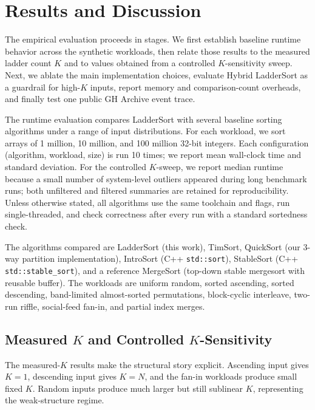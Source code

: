 \documentclass[10pt]{article}
\begin{document}
\section{\texorpdfstring{\textbf{Results and Discussion}}{Results and Discussion}}\label{results-and-discussion}

The empirical evaluation proceeds in stages. We first establish baseline
runtime behavior across the synthetic workloads, then relate those results to
the measured ladder count \(K\) and to values obtained from a controlled
\(K\)-sensitivity sweep. Next, we ablate the main implementation choices,
evaluate Hybrid LadderSort as a guardrail for high-\(K\) inputs, report memory
and comparison-count overheads, and finally test one public GH Archive event
trace.

The runtime evaluation compares LadderSort with several baseline sorting
algorithms under a range of input distributions. For each workload, we sort
arrays of 1 million, 10 million, and 100 million 32-bit integers. Each
configuration (algorithm, workload, size) is run 10 times; we report mean
wall-clock time and standard deviation. For the controlled \(K\)-sweep, we
report median runtime because a small number of system-level outliers appeared
during long benchmark runs; both unfiltered and filtered summaries are retained
for reproducibility. Unless otherwise stated, all algorithms use the same
toolchain and flags, run single-threaded, and check correctness after every run
with a standard sortedness check.

The algorithms compared are LadderSort (this work), TimSort, QuickSort
(our 3-way partition implementation), IntroSort (C++ \texttt{std::sort}),
StableSort (C++ \texttt{std::stable\_sort}), and a reference MergeSort
(top-down stable mergesort with reusable buffer). The workloads are uniform
random, sorted ascending, sorted descending, band-limited almost-sorted
permutations, block-cyclic interleave, two-run riffle, social-feed fan-in, and
partial index merges.

\subsection{Measured \(K\) and Controlled \(K\)-Sensitivity}
\label{measured-k-and-k-sensitivity}

The measured-\(K\) results make the structural story explicit. Ascending input gives \(K=1\), descending input gives \(K=N\), and the fan-in workloads produce small fixed \(K\). Random inputs produce much larger but still sublinear \(K\), representing the weak-structure regime.
\end{document}
